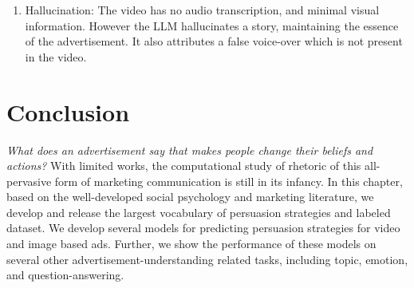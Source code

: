 \documentclass[hidelinks,11pt,a4paper]{report}
\begin{document}
\begin{enumerate}
\begin{enumerate}
            \item Hallucination: The video has no audio transcription, and minimal visual information. However the LLM hallucinates a story, maintaining the essence of the advertisement. It also attributes a false voice-over which is not present in the video.
        \end{enumerate}


    
\end{enumerate}



        
       

\section{Conclusion}
\textit{What does an advertisement say that makes people change their beliefs and actions?} With limited works, the computational study of rhetoric of this all-pervasive form of marketing communication is still in its infancy. In this chapter, based on the well-developed social psychology and marketing literature, we develop and release the largest vocabulary of persuasion strategies and labeled dataset. We develop several models for predicting persuasion strategies for video and image based ads. Further, we show the performance of these models on several other advertisement-understanding related tasks, including topic, emotion, and question-answering.





    

    
\end{document}
